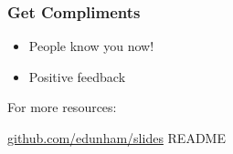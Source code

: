 \documentclass{beamer}
\begin{document}
\begin{frame}[fragile]
\frametitle{Get Compliments}
\begin{itemize}[<+(1)->]
\item People know you now!
\item Positive feedback
\end{itemize}
\end{frame}

\begin{frame}[fragile]
For more resources:

\url{github.com/edunham/slides} README
\end{frame}

\begin{frame}[fragile]
\titlepage
\end{frame}
\end{document}
